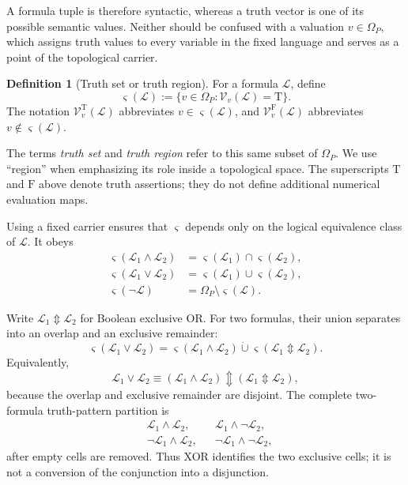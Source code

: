 \documentclass[11pt]{article}
\theoremstyle{definition}
\newtheorem{definition}{Definition}[section]
\theoremstyle{plain}
\theoremstyle{remark}
\newcommand{\True}{\mathrm{T}}
\newcommand{\False}{\mathrm{F}}
\begin{document}
A formula tuple is therefore syntactic, whereas a truth vector is one of its
possible semantic values.  Neither should be confused with a valuation
$v\in\Omega_P$, which assigns truth values to every variable in the fixed
language and serves as a point of the topological carrier.

\begin{definition}[Truth set or truth region]
For a formula $\mathcal L$, define
\[
  \varsigma(\mathcal L)
  :=\{v\in\Omega_P:\mathcal V_v(\mathcal L)=\True\}.
\]
The notation $\mathcal V_v^{\True}(\mathcal L)$ abbreviates
$v\in\varsigma(\mathcal L)$, and
$\mathcal V_v^{\False}(\mathcal L)$ abbreviates
$v\notin\varsigma(\mathcal L)$.
\end{definition}

The terms \emph{truth set} and \emph{truth region} refer to this same subset of
$\Omega_P$.  We use ``region'' when emphasizing its role inside a topological
space.  The superscripts $\True$ and $\False$ above denote truth assertions;
they do not define additional numerical evaluation maps.

Using a fixed carrier ensures that $\varsigma$ depends only on the logical
equivalence class of $\mathcal L$.  It obeys
\begin{align*}
 \varsigma(\mathcal L_1\wedge\mathcal L_2)
   &=\varsigma(\mathcal L_1)\cap\varsigma(\mathcal L_2),\\
 \varsigma(\mathcal L_1\vee\mathcal L_2)
   &=\varsigma(\mathcal L_1)\cup\varsigma(\mathcal L_2),\\
 \varsigma(\neg\mathcal L)
   &=\Omega_P\setminus\varsigma(\mathcal L).
\end{align*}

Write $\mathcal L_1\Updownarrow\mathcal L_2$ for Boolean exclusive OR.  For two
formulas, their union separates into an overlap and an exclusive remainder:
\[
 \varsigma(\mathcal L_1\vee\mathcal L_2)
 =\varsigma(\mathcal L_1\wedge\mathcal L_2)
  \mathbin{\dot\cup}
  \varsigma(\mathcal L_1\Updownarrow\mathcal L_2).
\]
Equivalently,
\[
 \mathcal L_1\vee\mathcal L_2
 \equiv
 (\mathcal L_1\wedge\mathcal L_2)
 \Updownarrow
 (\mathcal L_1\Updownarrow\mathcal L_2),
\]
because the overlap and exclusive remainder are disjoint.  The complete
two-formula truth-pattern partition is
\begin{align*}
 &\mathcal L_1\wedge\mathcal L_2,
 &&\mathcal L_1\wedge\neg\mathcal L_2,\\
 &\neg\mathcal L_1\wedge\mathcal L_2,
 &&\neg\mathcal L_1\wedge\neg\mathcal L_2,
\end{align*}
after empty cells are removed.  Thus XOR identifies the two exclusive cells;
it is not a conversion of the conjunction into a disjunction.
\end{document}
